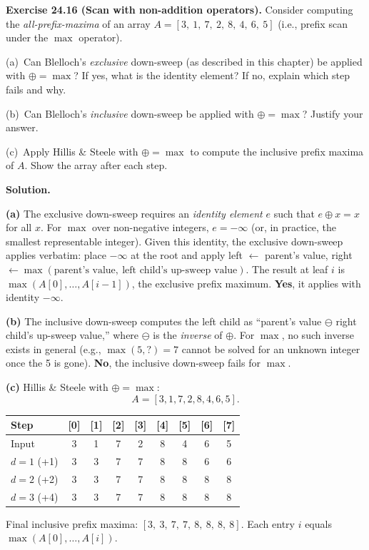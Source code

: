 \begin{ppexercises}
\textbf{Exercise 24.16 (Scan with non-addition operators).}
Consider computing the \emph{all-prefix-maxima} of an array
$A = [3,\ 1,\ 7,\ 2,\ 8,\ 4,\ 6,\ 5]$ (i.e., prefix scan under the
$\max$ operator).

(a)~Can Blelloch's \emph{exclusive} down-sweep (as described in this
chapter) be applied with $\oplus = \max$? If yes, what is the identity
element? If no, explain which step fails and why.

(b)~Can Blelloch's \emph{inclusive} down-sweep be applied with
$\oplus = \max$? Justify your answer.

(c)~Apply Hillis \& Steele with $\oplus = \max$ to compute the inclusive
prefix maxima of $A$. Show the array after each step.

\medskip
\textbf{Solution.}

\textbf{(a)} The exclusive down-sweep requires an \emph{identity element}
$e$ such that $e \oplus x = x$ for all $x$. For $\max$ over non-negative
integers, $e = -\infty$ (or, in practice, the smallest representable
integer). Given this identity, the exclusive down-sweep applies verbatim:
place $-\infty$ at the root and apply
left $\leftarrow$ parent's value,
right $\leftarrow \max(\text{parent's value},\ \text{left child's up-sweep value})$.
The result at leaf $i$ is $\max(A[0], \ldots, A[i-1])$, the exclusive
prefix maximum. \textbf{Yes}, it applies with identity $-\infty$.

\textbf{(b)} The inclusive down-sweep computes the left child as
``parent's value $\ominus$ right child's up-sweep value,'' where
$\ominus$ is the \emph{inverse} of $\oplus$. For $\max$, no such
inverse exists in general (e.g., $\max(5, ?) = 7$ cannot be solved
for an unknown integer once the 5 is gone). \textbf{No}, the inclusive
down-sweep fails for $\max$.

\textbf{(c)} Hillis \& Steele with $\oplus = \max$:
\[
A = [3, 1, 7, 2, 8, 4, 6, 5].
\]
\begin{center}
\begin{tabular}{lcccccccc}
\toprule
\textbf{Step} & [0] & [1] & [2] & [3] & [4] & [5] & [6] & [7] \\
\midrule
Input         & 3 & 1 & 7 & 2 & 8 & 4 & 6 & 5 \\
$d=1$ (+1)    & 3 & 3 & 7 & 7 & 8 & 8 & 6 & 6 \\
$d=2$ (+2)    & 3 & 3 & 7 & 7 & 8 & 8 & 8 & 8 \\
$d=3$ (+4)    & 3 & 3 & 7 & 7 & 8 & 8 & 8 & 8 \\
\bottomrule
\end{tabular}
\end{center}
Final inclusive prefix maxima: $[3,\ 3,\ 7,\ 7,\ 8,\ 8,\ 8,\ 8]$.
Each entry $i$ equals $\max(A[0], \ldots, A[i])$.
\end{ppexercises}

